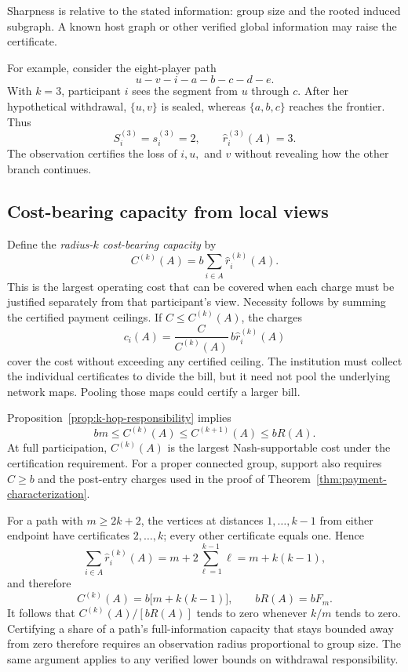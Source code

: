 \documentclass[preprint,12pt,authoryear]{elsarticle}
\begin{document}
Sharpness is relative to the stated information: group size and the rooted
induced subgraph. A known host graph or other verified global information may
raise the certificate.

For example, consider the eight-player path
\[
 u\!-\!v\!-\!i\!-\!a\!-\!b\!-\!c\!-\!d\!-\!e.
\]
With \(k=3\), participant \(i\) sees the segment from \(u\) through \(c\).
After her hypothetical withdrawal, \(\{u,v\}\) is sealed, whereas
\(\{a,b,c\}\) reaches the frontier. Thus
\[
 S_i^{(3)}=s_i^{(3)}=2,
 \qquad
 \hat r_i^{(3)}(A)=3.
\]
The observation certifies the loss of \(i,u,\) and \(v\) without revealing
how the other branch continues.

\subsection{Cost-bearing capacity from local views}

Define the \emph{radius-\(k\) cost-bearing capacity} by
\[
 C^{(k)}(A)=b\sum_{i\in A}\hat r_i^{(k)}(A).
\]
This is the largest operating cost that can be covered when each charge must
be justified separately from that participant's view. Necessity follows by
summing the certified payment ceilings. If \(C\leq C^{(k)}(A)\), the charges
\[
 c_i(A)=
 \frac{C}{C^{(k)}(A)}\,b\hat r_i^{(k)}(A)
\]
cover the cost without exceeding any certified ceiling. The institution must
collect the individual certificates to divide the bill, but it need not pool
the underlying network maps. Pooling those maps could certify a larger bill.

Proposition~\ref{prop:k-hop-responsibility} implies
\[
 bm\leq C^{(k)}(A)
 \leq C^{(k+1)}(A)
 \leq bR(A).
\]
At full participation, \(C^{(k)}(A)\) is the largest Nash-supportable cost
under the certification requirement. For a proper connected group, support
also requires \(C\geq b\) and the post-entry charges used in the proof of
Theorem~\ref{thm:payment-characterization}.

For a path with \(m\geq2k+2\), the vertices at distances
\(1,\ldots,k-1\) from either endpoint have certificates
\(2,\ldots,k\); every other certificate equals one. Hence
\[
 \sum_{i\in A}\hat r_i^{(k)}(A)
 =m+2\sum_{\ell=1}^{k-1}\ell
 =m+k(k-1),
\]
and therefore
\[
 C^{(k)}(A)=b\bigl[m+k(k-1)\bigr],
 \qquad
 bR(A)=bF_m.
\]
It follows that \(C^{(k)}(A)/[bR(A)]\) tends to zero whenever \(k/m\)
tends to zero. Certifying a share of a path's full-information capacity that
stays bounded away from zero therefore requires an observation radius
proportional to group size.
The same argument applies to any verified lower bounds on withdrawal
responsibility.
\end{document}
